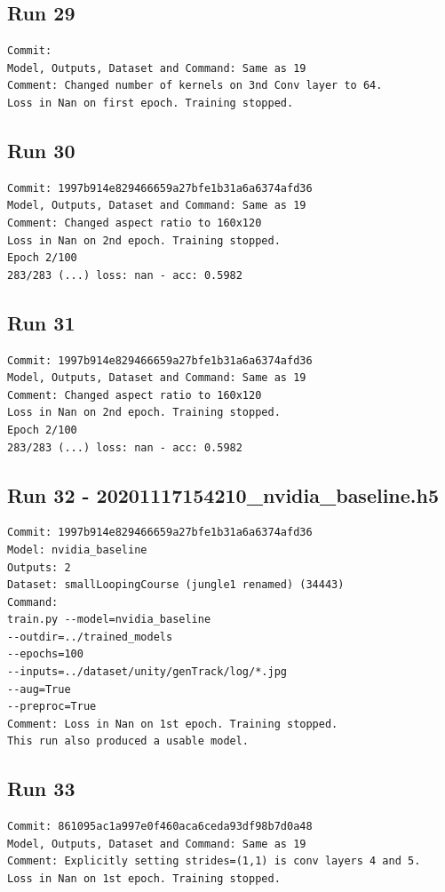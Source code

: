 \subsection{Run 29}
\begin{verbatim}
Commit:   
Model, Outputs, Dataset and Command: Same as 19
Comment: Changed number of kernels on 3nd Conv layer to 64.
Loss in Nan on first epoch. Training stopped.
\end{verbatim}

\subsection{Run 30}
\begin{verbatim}
Commit: 1997b914e829466659a27bfe1b31a6a6374afd36  
Model, Outputs, Dataset and Command: Same as 19
Comment: Changed aspect ratio to 160x120
Loss in Nan on 2nd epoch. Training stopped.
Epoch 2/100
283/283 (...) loss: nan - acc: 0.5982
\end{verbatim}

\subsection{Run 31}
\begin{verbatim}
Commit: 1997b914e829466659a27bfe1b31a6a6374afd36  
Model, Outputs, Dataset and Command: Same as 19
Comment: Changed aspect ratio to 160x120
Loss in Nan on 2nd epoch. Training stopped.
Epoch 2/100
283/283 (...) loss: nan - acc: 0.5982
\end{verbatim}

\subsection{Run 32 - 20201117154210\_nvidia\_baseline.h5}
\begin{verbatim}
Commit: 1997b914e829466659a27bfe1b31a6a6374afd36  
Model: nvidia_baseline
Outputs: 2
Dataset: smallLoopingCourse (jungle1 renamed) (34443)
Command: 
train.py --model=nvidia_baseline
--outdir=../trained_models
--epochs=100
--inputs=../dataset/unity/genTrack/log/*.jpg
--aug=True
--preproc=True
Comment: Loss in Nan on 1st epoch. Training stopped.
This run also produced a usable model.
\end{verbatim}

\subsection{Run 33}
\begin{verbatim}
Commit: 861095ac1a997e0f460aca6ceda93df98b7d0a48  
Model, Outputs, Dataset and Command: Same as 19
Comment: Explicitly setting strides=(1,1) is conv layers 4 and 5.
Loss in Nan on 1st epoch. Training stopped.
\end{verbatim}

